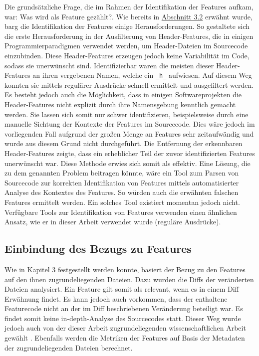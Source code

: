 Die grundsätzliche Frage, die im Rahmen der Identifikation der Features aufkam, war: \glqq Was wird als Feature gezählt?\grqq. Wie bereits in \hyperref[construction]{Abschnitt 3.2} erwähnt wurde, barg die Identifikation der Features einige Herausforderungen. So gestaltete sich die erste Herausforderung in der Ausfilterung von \glqq Header-Features\grqq{}, die in einigen Programmierparadigmen verwendet werden, um Header-Dateien im Sourcecode einzubinden. Diese Header-Features erzeugen jedoch keine Variabilität im Code, sodass sie unerwünscht sind. Identifizierbar waren die meisten dieser Header-Features an ihren vergebenen Namen, welche ein \texttt{\_h\_} aufwiesen. Auf diesem Weg konnten sie mittels regulärer Ausdrücke schnell ermittelt und ausgefiltert werden. Es besteht jedoch auch die Möglichkeit, dass in einigen Softwareprojekten die Header-Features nicht explizit durch ihre Namensgebung kenntlich gemacht werden. Sie lassen sich somit nur schwer identifizieren, beispielsweise durch eine manuelle Sichtung der Kontexte der Features im Sourcecode. Dies wäre jedoch im vorliegenden Fall aufgrund der großen Menge an Features sehr zeitaufwändig und wurde aus diesem Grund nicht durchgeführt. Die Entfernung der erkennbaren Header-Features zeigte, dass ein erheblicher Teil der zuvor identifizierten Features unerwünscht war. Diese Methode erwies sich somit als effektiv.
Eine Lösung, die zu dem genannten Problem beitragen könnte, wäre ein Tool zum Parsen von Sourcecode zur korrekten Identifikation von Features mittels automatisierter Analyse des Kontextes des Features. So würden auch die erwähnten \glqq falschen\grqq{} Features ermittelt werden. Ein solches Tool existiert momentan jedoch nicht. Verfügbare Tools zur Identifikation von Features verwenden einen ähnlichen Ansatz, wie er in dieser Arbeit verwendet wurde (reguläre Ausdrücke).

\subsection*{Einbindung des Bezugs zu Features}
Wie in Kapitel 3 festgestellt werden konnte, basiert der Bezug zu den Features auf den ihnen zugrundeliegenden Dateien. Dazu wurden die Diffs der veränderten Dateien analysiert. Ein Feature gilt somit als relevant, wenn es in einem Diff Erwähnung findet. Es kann jedoch auch vorkommen, dass der enthaltene Featurecode nicht an der im Diff beschriebenen Veränderung beteiligt war. Es findet somit keine \glqq in-depth\grqq -Analyse des Sourcecodes statt. Dieser Weg wurde jedoch auch von der dieser Arbeit zugrundeliegenden wissenschaftlichen Arbeit gewählt \cite{Queiroz2016}. Ebenfalls werden die Metriken der Features auf Basis der Metadaten der zugrundeliegenden Dateien berechnet.

